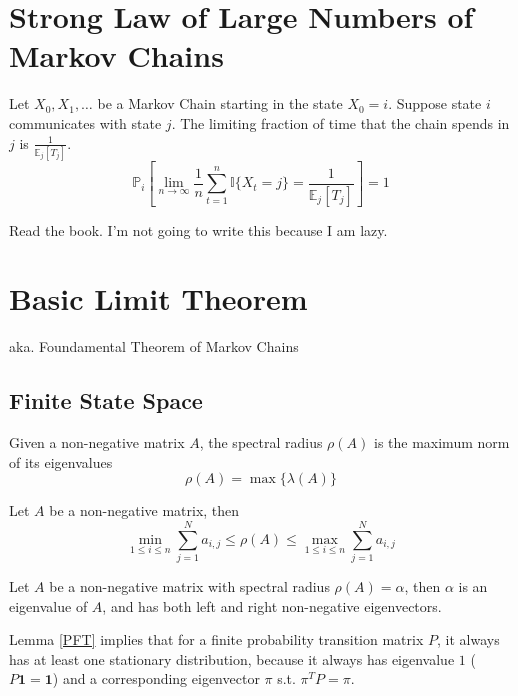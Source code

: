 \section{Strong Law of Large Numbers of Markov Chains}
\begin{theorem}\label{SLLN}
    Let $X_0, X_1, \dots$ be a Markov Chain starting in the state $X_0=i$. Suppose state $i$ communicates with state $j$. The limiting fraction of time that the chain spends in $j$ is $\frac{1}{\mathbb{E}_j[T_j]}$.
    \[ \mathbb{P}_i[\lim_{n\to\infty}\frac{1}{n}\sum_{t=1}^n\mathbb{I}\{X_t=j\} = \frac{1}{\mathbb{E}_j[T_j]}] = 1 \]
\end{theorem}
\begin{sketchproof}
    Read the book. I'm not going to write this because I am lazy.
\end{sketchproof}


\section{Basic Limit Theorem}\label{BasicLimitTheorem}
aka. Foundamental Theorem of Markov Chains

    \subsection{Finite State Space}
    \begin{definition}
        Given a non-negative matrix $A$, the spectral radius $\rho(A)$ is the maximum norm of its eigenvalues
        \[ \rho(A) = \max\{ \lambda(A) \} \]
    \end{definition}
    \begin{proposition}
        Let $A$ be a non-negative matrix, then
        \[ \min_{1\le i \le n} \sum_{j=1}^N a_{i,j} \le \rho(A) \le \max_{1\le i \le n} \sum_{j=1}^N a_{i,j} \]
    \end{proposition}
    \begin{lemma}\label{PFT}
        Let $A$ be a non-negative matrix with spectral radius $\rho(A) = \alpha$, then $\alpha$ is an eigenvalue of $A$, and has both left and right non-negative eigenvectors.
    \end{lemma}
    \begin{remark}
        Lemma \ref{PFT} implies that for a finite probability transition matrix $P$, it always has at least one stationary distribution, because it always has eigenvalue $1$ ($P\mathbf{1} = \mathbf{1}$) and a corresponding eigenvector $\pi$ s.t. $\pi^TP = \pi$.
    \end{remark}

